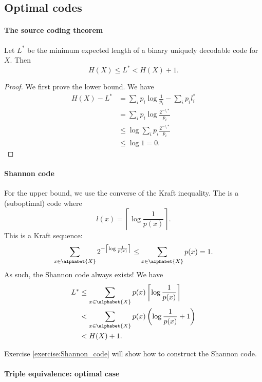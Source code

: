 \documentclass[a4paper, 11pt, openany]{book}
\begin{document}
\subsection{Optimal codes}

\paragraph{The source coding theorem}

\begin{theorem}
Let $L^*$ be the minimum expected length of a binary uniquely decodable code for $X$. Then
$$
	H(X) \le L^* < H(X) + 1.
$$
\end{theorem}

\begin{proof}
We first prove the lower bound. We have
\begin{align*}
	H(X) - L^* &= \sum_i p_i \log \frac{1}{p_i} - \sum_i p_i l_i^* \\
	&= \sum_i p_i \log \frac{2^{-l_i*}}{p_i}\\
	&\le \log \sum_i p_i \frac{2^{-l_i*}}{p_i}\\
	&\le \log 1 = 0.
\end{align*}
\end{proof}



\paragraph{Shannon code}

For the upper bound, we use the converse of the Kraft inequality. The  is a (suboptimal) code where
\[
	l(x) = \left\lceil \log \frac{1}{p(x)} \right\rceil.
\]
This is a Kraft sequence:
\[
	\sum_{x \in \alphabet{X}} 2^{-\left\lceil \log \frac{1}{p(x)} \right\rceil} \le \sum_{x \in \alphabet{X}} p(x) = 1.
\]
As such, the Shannon code always exists! We have
\begin{align*}
	L^* &\le \sum_{x \in \alphabet{X}} p(x) \left\lceil \log \frac{1}{p(x)} \right\rceil\\
	&< \sum_{x \in \alphabet{X}} p(x) \left(\log \frac{1}{p(x)} + 1 \right)\\
	&< H(X) + 1.
\end{align*}

Exercise \ref{exercise:Shannon_code} will show how to construct the Shannon code.






\paragraph{Triple equivalence: optimal case}
\end{document}
